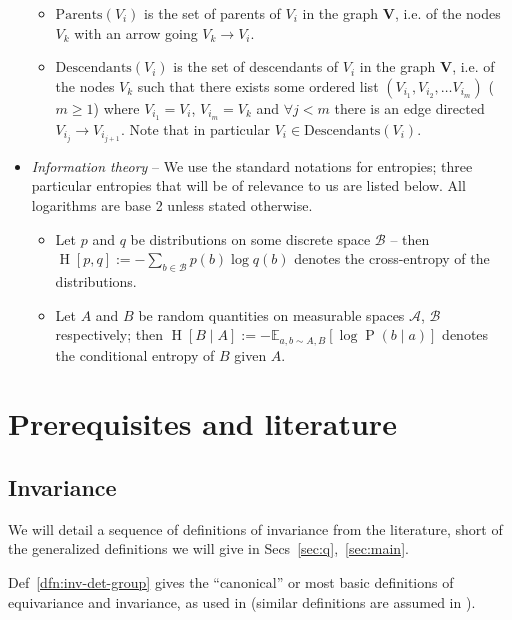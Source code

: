 \documentclass[12pt]{article}
\newcommand{\Ent}[1]{\operatorname{H}\left[#1\right]}
\newcommand{\E}[2][{}]{\mathbb{E}_{#1}\left[#2\right]}
\newcommand{\Prob}[1]{\operatorname{P}\left(#1\right)}
\theoremstyle{definition}
\numberwithin{equation}{section}
\numberwithin{figure}{section}
\numberwithin{table}{section}
\begin{document}
\begin{itemize}
    \begin{itemize}
        \item $\mathrm{Parents}(V_i)$ is the set of parents of $V_i$ in the graph $\mathbf{V}$, i.e. of the nodes $V_k$ with an arrow going $V_k\to V_i$.
        \item $\mathrm{Descendants}(V_i)$ is the set of descendants of $V_i$ in the graph $\mathbf{V}$, i.e. of the nodes $V_k$ such that there exists some ordered list $(V_{i_1}, V_{i_2}, \dots V_{i_m})$ ($m\ge 1$) where $V_{i_1}=V_i$, $V_{i_m}=V_k$ and $\forall j<m$ there is an edge directed $V_{i_j}\rightarrow V_{i_{j+1}}$. Note that in particular $V_i\in\mathrm{Descendants}(V_i)$.
    \end{itemize}
    \item \emph{Information theory} -- We use the standard notations for entropies; three particular entropies that will be of relevance to us are listed below. All logarithms are base 2 unless stated otherwise.
    \begin{itemize}
        \item Let $p$ and $q$ be distributions on some discrete space $\mathcal{B}$ -- then $\Ent{p,q}:=-\sum_{b\in\mathcal{B}}{p(b)\log q(b)}$ denotes the cross-entropy of the distributions. 
        \item Let $A$ and $B$ be random quantities on measurable spaces $\mathcal{A}$, $\mathcal{B}$ respectively; then $\Ent{B\mid A}:=-\E[a,b\sim A, B]{\log \Prob{b\mid a}}$ denotes the conditional entropy of $B$ given $A$.
    \end{itemize}
\end{itemize}

\pagebreak
\section{Prerequisites and literature} 

\subsection{Invariance}
\label{sec:inv}

We will detail a sequence of definitions of invariance from the literature, short of the generalized definitions we will give in Secs~\ref{sec:q},~\ref{sec:main}. 

Def~\ref{dfn:inv-det-group} gives the ``canonical'' or most basic definitions of equivariance and invariance, as used in \cite{trivedi} (similar definitions are assumed in \cite{cohen, cohen2, esteves, gerken, reiset}).
\end{document}
